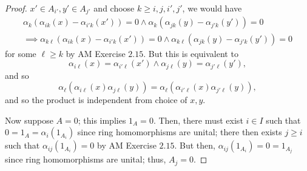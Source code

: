 \documentclass[12pt,letterpaper]{article}
\theoremstyle{definition}
\theoremstyle{remark}
\numberwithin{figure}{problem}
\numberwithin{equation}{section}
\begin{document}
\begin{proof}
  $x' \in A_{i'}, y' \in
  A_{j'}$ and choose
  $k \geqslant
  i,j,i',j'$, we would have
  \begin{multline*}
    \alpha_{k}(\alpha_{ik}(x) - \alpha_{i'k}(x')) = 0 \land \alpha_{k}(\alpha_{jk}(y) - \alpha_{j'k}(y')) = 0\\
    \implies \alpha_{k\ell}(\alpha_{ik}(x) - \alpha_{i'k}(x')) = 0 \land \alpha_{k\ell}(\alpha_{jk}(y) - \alpha_{j'k}(y')) = 0
  \end{multline*}
  for some
  $\ell \geqslant
  k$ by AM Exercise
  $2.15$.
  But this is equivalent to
  \begin{equation*}
    \alpha_{i\ell}(x) = \alpha_{i'\ell}(x') \land \alpha_{j\ell}(y) = \alpha_{j'\ell}(y'),
  \end{equation*}
  and so
  \begin{equation*}
    \alpha_{\ell}(\alpha_{i\ell}(x)\alpha_{j\ell}(y)) = \alpha_{\ell}(\alpha_{i'\ell}(x)\alpha_{j'\ell}(y)),
  \end{equation*}
  and so the product is independent from choice of
  $x,y$.
  \par Now suppose
  $A=0$; this implies
  $1_A =
  0$.
  Then, there must exist
  $i \in
  I$ such that
  $0 = 1_A =
  \alpha_i(1_{A_i})$ since ring homomorphisms are unital; there then exists
  $j \geqslant
  i$ such that
  $\alpha_{ij}(1_{A_i}) =
  0$ by AM Exercise
  $2.15$.
  But then,
  $\alpha_{ij}(1_{A_i}) = 0 =
  1_{A_j}$ since ring homomorphisms are unital; thus,
  $A_j =
  0$.
\end{proof}
\end{document}
